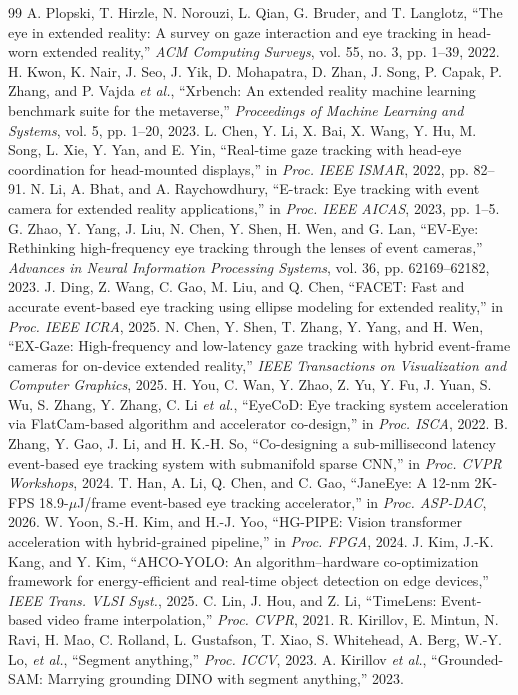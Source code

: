 \documentclass[journal]{IEEEtran}
\newcommand{\etal}{\textit{et al.}}
\begin{document}
\begin{thebibliography}{99}
\footnotesize
{} A. Plopski, T. Hirzle, N. Norouzi, L. Qian, G. Bruder, and T. Langlotz, ``The eye in extended reality: A survey on gaze interaction and eye tracking in head-worn extended reality,'' \emph{ACM Computing Surveys}, vol. 55, no. 3, pp. 1--39, 2022.
 H. Kwon, K. Nair, J. Seo, J. Yik, D. Mohapatra, D. Zhan, J. Song, P. Capak, P. Zhang, and P. Vajda \etal, ``Xrbench: An extended reality machine learning benchmark suite for the metaverse,'' \emph{Proceedings of Machine Learning and Systems}, vol. 5, pp. 1--20, 2023.
 L. Chen, Y. Li, X. Bai, X. Wang, Y. Hu, M. Song, L. Xie, Y. Yan, and E. Yin, ``Real-time gaze tracking with head-eye coordination for head-mounted displays,'' in \emph{Proc. IEEE ISMAR}, 2022, pp. 82--91.
 N. Li, A. Bhat, and A. Raychowdhury, ``E-track: Eye tracking with event camera for extended reality applications,'' in \emph{Proc. IEEE AICAS}, 2023, pp. 1--5.
 G. Zhao, Y. Yang, J. Liu, N. Chen, Y. Shen, H. Wen, and G. Lan, ``EV-Eye: Rethinking high-frequency eye tracking through the lenses of event cameras,'' \emph{Advances in Neural Information Processing Systems}, vol. 36, pp. 62169--62182, 2023.
 J. Ding, Z. Wang, C. Gao, M. Liu, and Q. Chen, ``FACET: Fast and accurate event-based eye tracking using ellipse modeling for extended reality,'' in \emph{Proc. IEEE ICRA}, 2025.
 N. Chen, Y. Shen, T. Zhang, Y. Yang, and H. Wen, ``EX-Gaze: High-frequency and low-latency gaze tracking with hybrid event-frame cameras for on-device extended reality,'' \emph{IEEE Transactions on Visualization and Computer Graphics}, 2025.
 H. You, C. Wan, Y. Zhao, Z. Yu, Y. Fu, J. Yuan, S. Wu, S. Zhang, Y. Zhang, C. Li \etal, ``EyeCoD: Eye tracking system acceleration via FlatCam-based algorithm and accelerator co-design,'' in \emph{Proc. ISCA}, 2022.
 B. Zhang, Y. Gao, J. Li, and H. K.-H. So, ``Co-designing a sub-millisecond latency event-based eye tracking system with submanifold sparse CNN,'' in \emph{Proc. CVPR Workshops}, 2024.
 T. Han, A. Li, Q. Chen, and C. Gao, ``JaneEye: A 12-nm 2K-FPS 18.9-$\mu$J/frame event-based eye tracking accelerator,'' in \emph{Proc. ASP-DAC}, 2026.
 W. Yoon, S.-H. Kim, and H.-J. Yoo, ``HG-PIPE: Vision transformer acceleration with hybrid-grained pipeline,'' in \emph{Proc. FPGA}, 2024.
 J. Kim, J.-K. Kang, and Y. Kim, ``AHCO-YOLO: An algorithm--hardware co-optimization framework for energy-efficient and real-time object detection on edge devices,'' \emph{IEEE Trans. VLSI Syst.}, 2025.
 C. Lin, J. Hou, and Z. Li, ``TimeLens: Event-based video frame interpolation,'' \emph{Proc. CVPR}, 2021.
 R. Kirillov, E. Mintun, N. Ravi, H. Mao, C. Rolland, L. Gustafson, T. Xiao, S. Whitehead, A. Berg, W.-Y. Lo, \etal, ``Segment anything,'' \emph{Proc. ICCV}, 2023.
 A. Kirillov \etal, ``Grounded-SAM: Marrying grounding DINO with segment anything,'' 2023.
\end{thebibliography}
\end{document}
